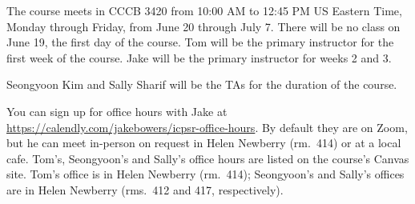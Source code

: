 The course meets in CCCB 3420 from 10:00 AM to 12:45 PM US Eastern Time, Monday through Friday, from June 20
through July 7. There will be no class on June 19, the first day of the
course. Tom will be the primary instructor for the first week of the
course. Jake will be the primary instructor for weeks 2 and 3. 

Seongyoon Kim and Sally Sharif will be the TAs for the duration of the course.

You can sign up for office hours with Jake at
\href{Calendly}{https://calendly.com/jakebowers/icpsr-office-hours}. By default
they are on Zoom, but he can meet in-person on request in Helen Newberry (rm.~414) or at a local cafe. Tom's, Seongyoon's and Sally's office hours are listed on the course's Canvas site. Tom's office is in Helen Newberry (rm.~414); Seongyoon's and Sally's offices are in Helen Newberry (rms.~412 and 417, respectively).


